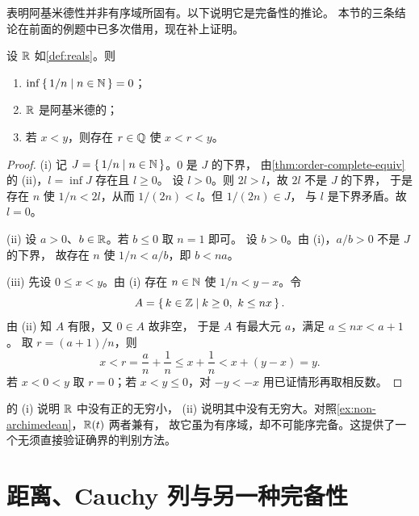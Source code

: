  表明阿基米德性并非有序域所固有。以下说明它是完备性的推论。
本节的三条结论在前面的例题中已多次借用，现在补上证明。

\begin{theorem}
  \label{thm:complete-implies-arch}
  设 \(\mathbb{R}\) 如\cref{def:reals}。则
  \begin{enumerate}[label=(\roman*)]
    \item \(\inf \left\{\,1/n \;\middle|\; n \in \mathbb{N}\,\right\} = 0\)；
    \item \(\mathbb{R}\) 是阿基米德的；
    \item 若 \(x < y\)，则存在 \(r \in \mathbb{Q}\) 使 \(x < r < y\)。
  \end{enumerate}
\end{theorem}

\begin{proof}
  (i) 记 \(J = \left\{\,1/n \;\middle|\; n \in \mathbb{N}\,\right\}\)。\(0\) 是 \(J\) 的下界，
  由\cref{thm:order-complete-equiv} 的 (ii)，\(l = \inf J\) 存在且 \(l \ge 0\)。
  设 \(l > 0\)。则 \(2l > l\)，故 \(2l\) 不是 \(J\) 的下界，
  于是存在 \(n\) 使 \(1/n < 2l\)，从而 \(1/(2n) < l\)。但 \(1/(2n) \in J\)，
  与 \(l\) 是下界矛盾。故 \(l = 0\)。

  (ii) 设 \(a > 0\)、\(b \in \mathbb{R}\)。若 \(b \le 0\) 取 \(n = 1\) 即可。
  设 \(b > 0\)。由 (i)，\(a/b > 0\) 不是 \(J\) 的下界，
  故存在 \(n\) 使 \(1/n < a/b\)，即 \(b < na\)。

  (iii) 先设 \(0 \le x < y\)。由 (i) 存在 \(n \in \mathbb{N}\) 使 \(1/n < y - x\)。令
  \[
    A = \left\{\,k \in \mathbb{Z} \;\middle|\; k \ge 0,\ k \le nx\,\right\} .
  \]
  由 (ii) 知 \(A\) 有限，又 \(0 \in A\) 故非空，
  于是 \(A\) 有最大元 \(a\)，满足 \(a \le nx < a + 1\)。
  取 \(r = (a+1)/n\)，则
  \begin{equation}
    \label{eq:density-estimate}
    x < r = \frac{a}{n} + \frac{1}{n} \le x + \frac{1}{n} < x + (y - x) = y .
  \end{equation}
  若 \(x < 0 < y\) 取 \(r = 0\)；若 \(x < y \le 0\)，对 \(-y < -x\) 用已证情形再取相反数。
\end{proof}

\begin{remark}
   的 (i) 说明 \(\mathbb{R}\) 中没有正的无穷小，
  (ii) 说明其中没有无穷大。对照\cref{ex:non-archimedean}，\(\mathbb{R}(t)\) 两者兼有，
  故它虽为有序域，却不可能序完备。这提供了一个无须直接验证确界的判别方法。
\end{remark}

\section{距离、Cauchy 列与另一种完备性}
\label{sec:cauchy}

